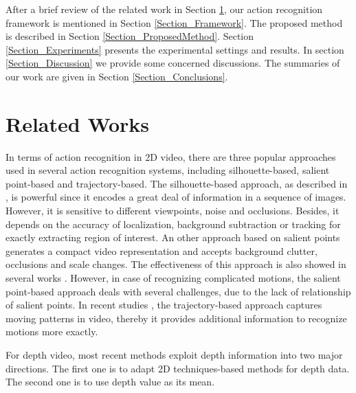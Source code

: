 \documentclass[final,3p,times,twocolumn]{elsarticle}
\begin{document}
After a brief review of the related work in Section \ref{Section_RelatedWorks}, our action recognition framework is mentioned in Section \ref{Section_Framework}. The proposed method is described in Section \ref{Section_ProposedMethod}. Section \ref{Section_Experiments} presents the experimental settings and results. In section \ref{Section_Discussion} we provide some concerned discussions. The summaries of our work are given in Section \ref{Section_Conclusions}.

\section{Related Works}
\label{Section_RelatedWorks}

In terms of action recognition in 2D video, there are three popular approaches used in several action recognition systems, including silhouette-based, salient point-based and trajectory-based.
The silhouette-based approach, as described in \cite{blank2005actions, ke2007event, vitaladevuni2008action, yilmaz2005actions}, is powerful since it encodes a great deal of information in a sequence of images.
However, it is sensitive to different viewpoints, noise and occlusions.
Besides, it depends on the accuracy of localization, background subtraction or tracking for exactly extracting region of interest.
An other approach based on salient points generates a compact video representation and accepts background clutter, occlusions and scale changes.
The effectiveness of this approach is also showed in several works \cite{laptev2005space, dollar2005behavior, laptev2008learning, bregonzio2009recognising, klaser2008aspatiotemporal, willems2008efficient}.
However, in case of recognizing complicated motions, the salient point-based approach deals with several challenges, due to the lack of relationship of salient points.
In recent studies \cite{matikainen2009trajectons, messing2009activity, sun2009hierarchical}, the trajectory-based approach captures moving patterns in video, thereby it provides additional information to recognize motions more exactly.

For depth video, most recent methods exploit depth information into two major directions. The first one is to adapt 2D techniques-based methods for depth data. The second one is to use depth value as its mean.
\end{document}

